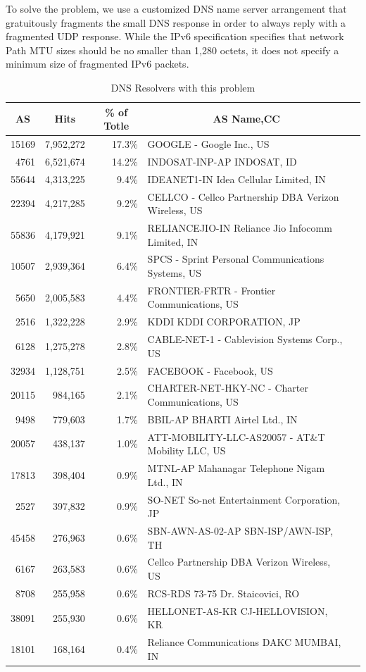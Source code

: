 To solve the problem, we use a customized DNS name server arrangement that gratuitously 
fragments the small DNS response in order to always reply with a fragmented UDP response. 
While the IPv6 specification specifies that network Path MTU sizes should be no smaller than 1,280 
octets, it does not specify a minimum size of fragmented IPv6 packets.

\begin{table}[t]
	\caption{DNS Resolvers with this problem}
	\centering
\begin{tabular}{@{}rrrll@{}}
\toprule
\multicolumn{1}{c}{\textbf{AS}} & \multicolumn{1}{c}{\textbf{Hits}} & \multicolumn{1}{c}{\textbf{\% of Totle}} & \multicolumn{1}{c}{\textbf{AS Name,CC}} &  \\ \midrule
15169 & 7,952,272 & 17.3\% & GOOGLE - Google Inc., US &  \\
4761 & 6,521,674 & 14.2\% & INDOSAT-INP-AP INDOSAT, ID &  \\
55644 & 4,313,225 & 9.4\% & IDEANET1-IN Idea Cellular Limited, IN &  \\ 
22394 & 4,217,285 & 9.2\% & CELLCO - Cellco Partnership DBA Verizon Wireless, US &  \\
55836 & 4,179,921 & 9.1\% & RELIANCEJIO-IN Reliance Jio Infocomm Limited, IN &  \\
10507 & 2,939,364 & 6.4\% & SPCS - Sprint Personal Communications Systems, US &  \\
5650  & 2,005,583 & 4.4\% & FRONTIER-FRTR - Frontier Communications, US &  \\
2516  & 1,322,228 & 2.9\% & KDDI KDDI CORPORATION, JP &  \\
6128  & 1,275,278 & 2.8\% & CABLE-NET-1 - Cablevision Systems Corp., US &  \\
32934 & 1,128,751 & 2.5\% & FACEBOOK - Facebook, US &  \\
20115 & 984,165 & 2.1\% & CHARTER-NET-HKY-NC - Charter Communications, US &  \\
9498  & 779,603 & 1.7\% & BBIL-AP BHARTI Airtel Ltd., IN &  \\
20057 & 438,137 & 1.0\% & ATT-MOBILITY-LLC-AS20057 - AT\&T Mobility LLC, US &  \\
17813 & 398,404 & 0.9\% & MTNL-AP Mahanagar Telephone Nigam Ltd., IN &  \\
2527  & 397,832 & 0.9\% & SO-NET So-net Entertainment Corporation, JP &  \\
45458 & 276,963 & 0.6\% & SBN-AWN-AS-02-AP SBN-ISP/AWN-ISP, TH &  \\
6167  & 263,583 & 0.6\% & Cellco Partnership DBA Verizon Wireless, US &  \\
8708  & 255,958 & 0.6\% & RCS-RDS 73-75 Dr. Staicovici, RO &  \\
38091 & 255,930 & 0.6\% & HELLONET-AS-KR CJ-HELLOVISION, KR &  \\
18101 & 168,164 & 0.4\% & Reliance Communications DAKC MUMBAI, IN &  \\\bottomrule
\end{tabular}
\label{tab:AS_group}
\end{table}


